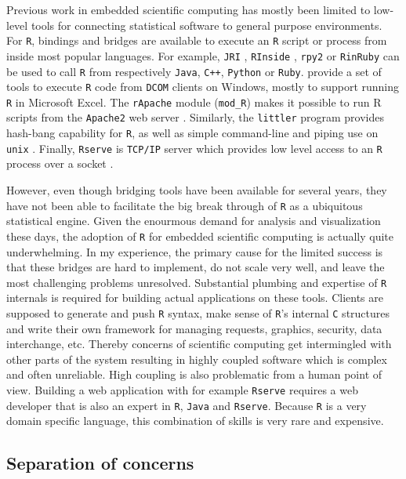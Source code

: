 \documentclass{article}
\newcommand{\R}{\texttt{R}\xspace}
\begin{document}
Previous work in embedded scientific computing has mostly been limited to low-level tools for connecting statistical software to general purpose environments. For \R, bindings and bridges are available to execute an \R script or process from inside most popular languages. For example, \texttt{JRI} \citep{rjava}, \texttt{RInside} \citep{eddelbuettel2011rcpp}, \texttt{rpy2} \citep{gautier2008rpy2} or \texttt{RinRuby} \citep{dahl2008rinruby} can be used to call \R from respectively \texttt{Java}, \texttt{C++}, \texttt{Python} or \texttt{Ruby}. \cite{heiberger2009r} provide a set of tools to execute \R code from \texttt{DCOM} clients on Windows, mostly to support running \R in Microsoft Excel. The \texttt{rApache} module (\texttt{mod\_R}) makes it possible to run R scripts from the \texttt{Apache2} web server \citep{horner2013rapache}. Similarly, the \texttt{littler} program provides hash-bang capability for \R, as well as simple command-line and piping use on \texttt{unix} \citep{littler}. Finally, \texttt{Rserve} is \texttt{TCP/IP} server which provides low level access to an \R process over a socket \citep{urbanek2013rserve}. 

However, even though bridging tools have been available for several years, they have not been able to facilitate the big break through of \R as a ubiquitous statistical engine. Given the enourmous demand for analysis and visualization these days, the adoption of \R for embedded scientific computing is actually quite underwhelming. In my experience, the primary cause for the limited success is that these bridges are hard to implement, do not scale very well, and leave the most challenging problems unresolved. Substantial plumbing and expertise of \R internals is required for building actual applications on these tools. Clients are supposed to generate and push \R syntax, make sense of \R's internal \texttt{C} structures and write their own framework for managing requests, graphics, security, data interchange, etc. Thereby concerns of scientific computing get intermingled with other parts of the system resulting in highly coupled software which is complex and often unreliable. High coupling is also problematic from a human point of view. Building a web application with for example \texttt{Rserve} requires a web developer that is also an expert in \R, \texttt{Java} and \texttt{Rserve}. Because \R is a very domain specific language, this combination of skills is very rare and expensive. 


\subsection{Separation of concerns}
\end{document}
